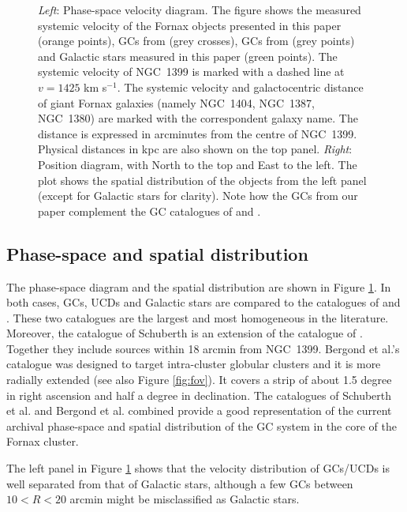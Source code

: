 \documentclass[useAMS,usenatbib]{mn2e}
\begin{document}
\begin{figure}
\caption{\textit{Left}: Phase-space velocity diagram. The figure shows the 
measured systemic velocity of the Fornax objects presented in this paper 
(orange points), GCs from \citet{Schuberth} (grey crosses), GCs from 
\citet{Bergond07} (grey points) and Galactic stars measured in this paper 
(green points). The systemic velocity of NGC~1399 is marked with a dashed line 
at $v = 1425$ km s$^{-1}$. The systemic velocity and galactocentric distance of 
giant Fornax galaxies (namely NGC~1404, NGC~1387, NGC~1380) are marked with 
the correspondent galaxy name.  The distance is expressed in 
arcminutes from the centre of NGC~1399. 
Physical distances in kpc are also shown on the top panel. 
\textit{Right}: Position diagram, with North to the top and East to the left. 
The plot shows the spatial distribution of the objects from the left panel 
(except for Galactic stars for clarity). Note how the GCs from our paper complement the GC 
catalogues of \citet{Schuberth} and \citet{Bergond07}. }
\label{fig:phase-space}
\end{figure}

\subsection{Phase-space and spatial distribution}

The phase-space diagram and the spatial distribution are shown in Figure 
\ref{fig:phase-space}. In both cases, GCs, UCDs and Galactic stars are compared 
to the catalogues of \citet{Bergond07} and \citet{Schuberth}. These two 
catalogues are the largest and most homogeneous in the literature. 
Moreover, 
the catalogue of Schuberth is an extension of the catalogue of 
\citet{Dirsch04}. Together they include sources within 18 arcmin from NGC~1399. 
Bergond et al.'s catalogue was designed to target intra-cluster globular clusters and 
it is more radially extended (see also Figure \ref{fig:fov}). It covers a strip 
of about 1.5 degree in right ascension and half a degree in declination. The 
catalogues of Schuberth et al. and Bergond et al. combined provide a good representation of 
the current archival phase-space and spatial distribution of the GC system in 
the core of the Fornax cluster. 

The left panel in Figure \ref{fig:phase-space} shows that the velocity 
distribution of GCs/UCDs is well separated from that of Galactic stars, 
although a few GCs between $10<R<20$ arcmin 
might be misclassified as Galactic 
stars. 
\end{document}
